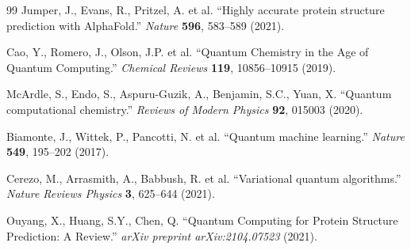 \documentclass[11pt,a4paper]{article}
\begin{document}
\begin{thebibliography}{99}
Jumper, J., Evans, R., Pritzel, A. et al. ``Highly accurate protein structure prediction with AlphaFold.'' \textit{Nature} \textbf{596}, 583–589 (2021).

Cao, Y., Romero, J., Olson, J.P. et al. ``Quantum Chemistry in the Age of Quantum Computing.'' \textit{Chemical Reviews} \textbf{119}, 10856–10915 (2019).

McArdle, S., Endo, S., Aspuru-Guzik, A., Benjamin, S.C., Yuan, X. ``Quantum computational chemistry.'' \textit{Reviews of Modern Physics} \textbf{92}, 015003 (2020).

Biamonte, J., Wittek, P., Pancotti, N. et al. ``Quantum machine learning.'' \textit{Nature} \textbf{549}, 195–202 (2017).

Cerezo, M., Arrasmith, A., Babbush, R. et al. ``Variational quantum algorithms.'' \textit{Nature Reviews Physics} \textbf{3}, 625–644 (2021).

Ouyang, X., Huang, S.Y., Chen, Q. ``Quantum Computing for Protein Structure Prediction: A Review.'' \textit{arXiv preprint arXiv:2104.07523} (2021).
\end{thebibliography}
\end{document}
